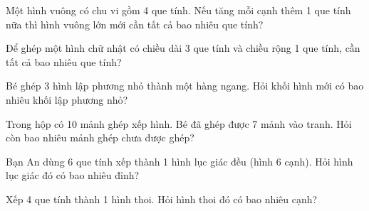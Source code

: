 \begin{ex}
Một hình vuông có chu vi gồm 4 que tính. Nếu tăng mỗi cạnh thêm 1 que tính nữa thì hình vuông lớn mới cần tất cả bao nhiêu que tính?
\end{ex}

\begin{ex}
Để ghép một hình chữ nhật có chiều dài 3 que tính và chiều rộng 1 que tính, cần tất cả bao nhiêu que tính?
\end{ex}

\begin{ex}
Bé ghép 3 hình lập phương nhỏ thành một hàng ngang. Hỏi khối hình mới có bao nhiêu khối lập phương nhỏ?
\end{ex}

\begin{ex}
Trong hộp có 10 mảnh ghép xếp hình. Bé đã ghép được 7 mảnh vào tranh. Hỏi còn bao nhiêu mảnh ghép chưa được ghép?
\end{ex}

\begin{ex}
Bạn An dùng 6 que tính xếp thành 1 hình lục giác đều (hình 6 cạnh). Hỏi hình lục giác đó có bao nhiêu đỉnh?
\end{ex}

\begin{ex}
Xếp 4 que tính thành 1 hình thoi. Hỏi hình thoi đó có bao nhiêu cạnh?
\end{ex}
